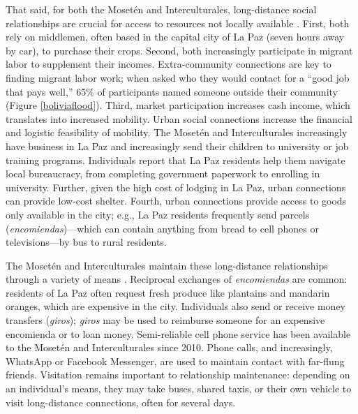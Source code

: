 \documentclass[bibauthoryear]{aa}
\begin{document}
That said, for both the Moset\'en and Interculturales, long-distance social relationships are crucial for access to resources not locally available \citep{pisorjones2020}.
 First, both rely on middlemen, often based in the capital city of La Paz (seven hours away by car), to purchase their crops. Second, both increasingly participate in migrant labor to supplement their incomes. Extra-community connections are key to finding migrant labor work; when asked who they would contact for a ``good job that pays well,'' 65\% of participants named someone outside their community (Figure \ref{boliviaflood}). Third, market participation increases cash income, which translates into increased mobility. Urban social connections increase the financial and logistic feasibility of mobility. The Moset\'en and Interculturales increasingly have business in La Paz and increasingly send their children to university or job training programs. Individuals report that La Paz residents help them navigate local bureaucracy, from completing government paperwork to enrolling in university. Further, given the high cost of lodging in La Paz, urban connections can provide low-cost shelter. Fourth, urban connections provide access to goods only available in the city; e.g., La Paz residents frequently send parcels (\textit{encomiendas})---which can contain anything from bread to cell phones or televisions---by bus to rural residents.

	The Moset\'en and Interculturales maintain these long-distance relationships through a variety of means \citep{pisorjones2020}. Reciprocal exchanges of \emph{encomiendas} are common: residents of La Paz often request fresh produce like plantains and mandarin oranges, which are expensive in the city. Individuals also send or receive money transfers (\textit{giros}); \textit{giros} may be used to reimburse someone for an expensive encomienda or to loan money. Semi-reliable cell phone service has been available to the Moset\'en and Interculturales since 2010. Phone calls, and increasingly, WhatsApp or Facebook Messenger, are used to maintain contact with far-flung friends. Visitation remains important to relationship maintenance: depending on an individual's means, they may take buses, shared taxis, or their own vehicle to visit long-distance connections, often for several days.
	
\end{document}
